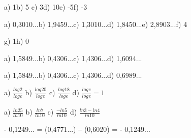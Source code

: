 \begin{respostas}{4}

    \ansitem{} a) 1\quad \quad b) 5 \quad \quad c) 3\quad \quad d) 10\quad \quad e) -5\quad \quad f) -3\quad 

    \ansitem{} a) 0,3010...\quad b) 1,9459...\quad c) 1,3010...\quad d) 1,8450...\quad e) 2,8903...\quad f) 4

\quad g) 1\quad \quad h) 0

\ansitem{} a) 1,5849...\quad b) 0,4306...\quad c) 1,4306...\quad d) 1,6094...

\ansitem{} a) 1,5849...\quad b) 0,4306...\quad c) 1,4306...\quad d) 0,6989...

\ansitem{} a)  \( \frac{log_{}2}{log_{}e} \) \quad b)  \( \frac{log_{}20}{log_{}e} \) \quad c)  \( \frac{log_{}18}{log_{}e} \) \quad d)  \( \frac{log_{}e}{log_{}e}=1 \) {\fontsize{14pt}{16.8pt}\selectfont  }

\ansitem{} a)  \( \frac{ln25}{ln10} \) \quad \quad b)  \( \frac{ln7}{ln10} \) \quad \quad c)  \( \frac{-ln5}{ln10} \) \quad \quad d)  \( \frac{ln3-ln4}{ln10} \) 

\ansitem{} - 0,1249... = (0,4771...) – (0,6020) = - 0,1249...

\end{respostas}

